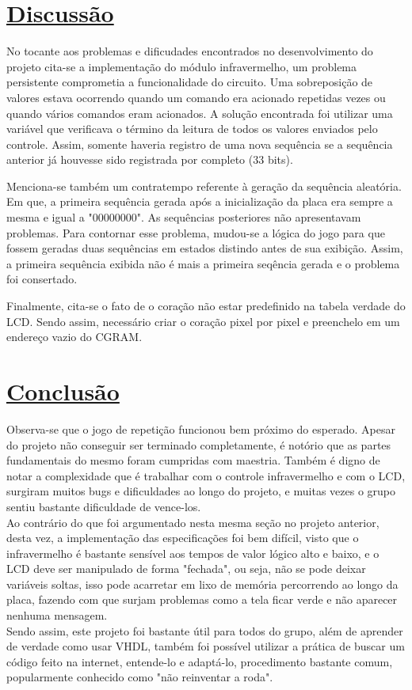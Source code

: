 \documentclass[14pt, oneside]{book}
\newcommand\tab[1][1cm]{\hspace*{#1}}
\theoremstyle{definition}
\begin{document}
            
        \chapter[Discussão]{\hyperlink{toc}{Discussão}} \hypertarget{ana}{}
            \tab No tocante aos problemas e dificudades encontrados no desenvolvimento do projeto cita-se a implementação do módulo infravermelho, um problema persistente comprometia a funcionalidade do circuito. Uma sobreposição de valores estava ocorrendo quando um comando era acionado repetidas vezes ou quando vários comandos eram acionados. A solução encontrada foi utilizar uma variável que verificava o término da leitura de todos os valores enviados pelo controle. Assim, somente haveria registro de uma nova sequência se a sequência anterior já houvesse sido registrada por completo ($33$ bits).
            
            \tab Menciona-se também um contratempo referente à geração da sequência aleatória. Em que, a primeira sequência gerada após a inicialização da placa era sempre a mesma e igual a "00000000". As sequências posteriores não apresentavam problemas. Para contornar esse problema, mudou-se a lógica do jogo para que fossem geradas duas sequências em estados distindo antes de sua exibição. Assim, a primeira sequência exibida não é mais a primeira seqência gerada e o problema foi consertado.
            
            \tab Finalmente, cita-se o fato de o coração não estar predefinido na tabela verdade do LCD. Sendo assim, necessário criar o coração pixel por pixel e preenchelo em um endereço vazio do CGRAM.  
                
        \chapter[Conclusão]{\hyperlink{toc}{Conclusão}}
            \tab Observa-se que o jogo de repetição funcionou bem próximo do esperado. Apesar do projeto não conseguir ser terminado completamente, é notório que as partes fundamentais do mesmo foram cumpridas com maestria. Também é digno de notar a complexidade que é trabalhar com o controle infravermelho e com o LCD, surgiram muitos bugs e dificuldades ao longo do projeto, e muitas vezes o grupo sentiu bastante dificuldade de vence-los. \\
            \tab Ao contrário do que foi argumentado nesta mesma seção no projeto anterior, desta vez, a implementação das especificações foi bem difícil, visto que o infravermelho é bastante sensível aos tempos de valor lógico alto e baixo, e o LCD deve ser manipulado de forma "fechada", ou seja, não se pode deixar variáveis soltas, isso pode acarretar em lixo de memória percorrendo ao longo da placa, fazendo com que surjam problemas como a tela ficar verde e não aparecer nenhuma mensagem. \\ 
            \tab Sendo assim, este projeto foi bastante útil para todos do grupo, além de aprender de verdade como usar VHDL, também foi possível utilizar a prática de buscar um código feito na internet, entende-lo e adaptá-lo, procedimento bastante comum, popularmente conhecido como "não reinventar a roda". 
                    
        
        
\end{document}
